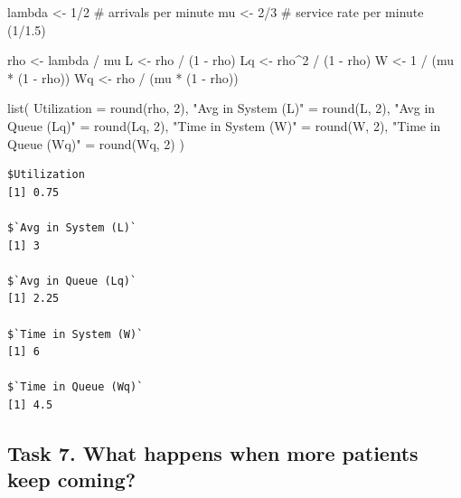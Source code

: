 \documentclass[
]{article}
\newenvironment{Shaded}{\begin{snugshade}}{\end{snugshade}}
\newcommand{\AttributeTok}[1]{\textcolor[rgb]{0.40,0.45,0.13}{#1}}
\newcommand{\CommentTok}[1]{\textcolor[rgb]{0.37,0.37,0.37}{#1}}
\newcommand{\DecValTok}[1]{\textcolor[rgb]{0.68,0.00,0.00}{#1}}
\newcommand{\FunctionTok}[1]{\textcolor[rgb]{0.28,0.35,0.67}{#1}}
\newcommand{\NormalTok}[1]{\textcolor[rgb]{0.00,0.23,0.31}{#1}}
\newcommand{\OtherTok}[1]{\textcolor[rgb]{0.00,0.23,0.31}{#1}}
\newcommand{\SpecialCharTok}[1]{\textcolor[rgb]{0.37,0.37,0.37}{#1}}
\newcommand{\StringTok}[1]{\textcolor[rgb]{0.13,0.47,0.30}{#1}}
\begin{document}
\begin{Shaded}
\begin{Highlighting}[]
\NormalTok{lambda }\OtherTok{\textless{}{-}} \DecValTok{1}\SpecialCharTok{/}\DecValTok{2}  \CommentTok{\# arrivals per minute}
\NormalTok{mu }\OtherTok{\textless{}{-}} \DecValTok{2}\SpecialCharTok{/}\DecValTok{3}      \CommentTok{\# service rate per minute (1/1.5)}

\NormalTok{rho }\OtherTok{\textless{}{-}}\NormalTok{ lambda }\SpecialCharTok{/}\NormalTok{ mu}
\NormalTok{L }\OtherTok{\textless{}{-}}\NormalTok{ rho }\SpecialCharTok{/}\NormalTok{ (}\DecValTok{1} \SpecialCharTok{{-}}\NormalTok{ rho)}
\NormalTok{Lq }\OtherTok{\textless{}{-}}\NormalTok{ rho}\SpecialCharTok{\^{}}\DecValTok{2} \SpecialCharTok{/}\NormalTok{ (}\DecValTok{1} \SpecialCharTok{{-}}\NormalTok{ rho)}
\NormalTok{W }\OtherTok{\textless{}{-}} \DecValTok{1} \SpecialCharTok{/}\NormalTok{ (mu }\SpecialCharTok{*}\NormalTok{ (}\DecValTok{1} \SpecialCharTok{{-}}\NormalTok{ rho))}
\NormalTok{Wq }\OtherTok{\textless{}{-}}\NormalTok{ rho }\SpecialCharTok{/}\NormalTok{ (mu }\SpecialCharTok{*}\NormalTok{ (}\DecValTok{1} \SpecialCharTok{{-}}\NormalTok{ rho))}

\FunctionTok{list}\NormalTok{(}
  \AttributeTok{Utilization =} \FunctionTok{round}\NormalTok{(rho, }\DecValTok{2}\NormalTok{),}
  \StringTok{"Avg in System (L)"} \OtherTok{=} \FunctionTok{round}\NormalTok{(L, }\DecValTok{2}\NormalTok{),}
  \StringTok{"Avg in Queue (Lq)"} \OtherTok{=} \FunctionTok{round}\NormalTok{(Lq, }\DecValTok{2}\NormalTok{),}
  \StringTok{"Time in System (W)"} \OtherTok{=} \FunctionTok{round}\NormalTok{(W, }\DecValTok{2}\NormalTok{),}
  \StringTok{"Time in Queue (Wq)"} \OtherTok{=} \FunctionTok{round}\NormalTok{(Wq, }\DecValTok{2}\NormalTok{)}
\NormalTok{)}
\end{Highlighting}
\end{Shaded}

\begin{verbatim}
$Utilization
[1] 0.75

$`Avg in System (L)`
[1] 3

$`Avg in Queue (Lq)`
[1] 2.25

$`Time in System (W)`
[1] 6

$`Time in Queue (Wq)`
[1] 4.5
\end{verbatim}

\subsection{Task 7. What happens when more patients keep
coming?}\label{task-7.-what-happens-when-more-patients-keep-coming}
\end{document}
